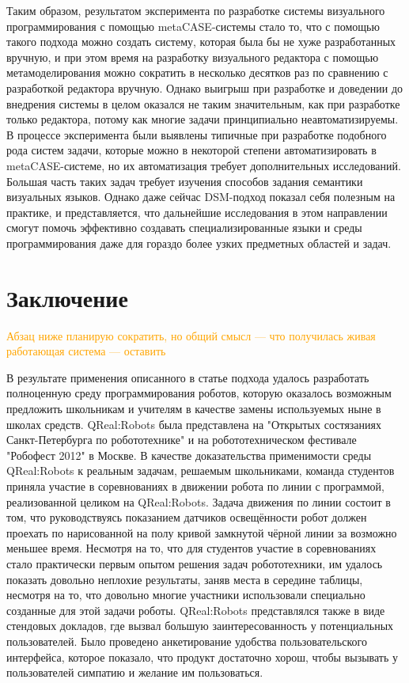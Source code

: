 \documentclass[a4paper]{article}
\begin{document}
Таким образом, результатом эксперимента по разработке системы визуального программирования с помощью metaCASE-системы стало то, что с помощью такого подхода можно создать систему, которая была бы не хуже разработанных вручную, и при этом время на разработку визуального редактора с помощью метамоделирования можно сократить в несколько десятков раз по сравнению с разработкой редактора вручную. Однако выигрыш при разработке и доведении до внедрения системы в целом оказался не таким значительным, как при разработке только редактора, потому как многие задачи принципиально неавтоматизируемы. В процессе эксперимента были выявлены типичные при разработке подобного рода систем задачи, которые можно в некоторой степени автоматизировать в metaCASE-системе, но их автоматизация требует дополнительных исследований. Большая часть таких задач требует изучения способов задания семантики визуальных языков. Однако даже сейчас DSM-подход показал себя полезным на практике, и представляется, что дальнейшие исследования в этом направлении смогут помочь эффективно создавать специализированные языки и среды программирования даже для гораздо более узких предметных областей и задач.

\section*{Заключение}
\textcolor{Orange}{Абзац ниже планирую сократить, но общий смысл --- что получилась живая работающая система --- оставить}

В результате применения описанного в статье подхода удалось разработать полноценную среду программирования роботов, которую оказалось возможным предложить школьникам и учителям в качестве замены используемых ныне в школах средств. QReal:Robots была представлена на "Открытых состязаниях Санкт-Петербурга по робототехнике" и на робототехническом фестивале "Робофест 2012" в Москве. В качестве доказательства применимости среды QReal:Robots к реальным задачам, решаемым школьниками, команда студентов приняла участие в соревнованиях в движении робота по линии с программой, реализованной целиком на QReal:Robots. Задача движения по линии состоит в том, что руководствуясь показанием датчиков освещённости робот должен проехать по нарисованной на полу кривой замкнутой чёрной линии за возможно меньшее время. Несмотря на то, что для студентов участие в соревнованиях стало практически первым опытом решения задач робототехники, им удалось показать довольно неплохие результаты, заняв места в середине таблицы, несмотря на то, что довольно многие участники использовали специально созданные для этой задачи роботы. QReal:Robots представлялся также в виде стендовых докладов, где вызвал большую заинтересованность у потенциальных пользователей. Было проведено анкетирование удобства пользовательского интерфейса, которое показало, что продукт достаточно хорош, чтобы вызывать у пользователей симпатию и желание им пользоваться.
\end{document}
